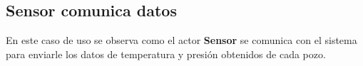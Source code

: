 \subsection{Sensor comunica datos}

\par En este caso de uso se observa como el actor \textbf{Sensor} se comunica con el sistema para enviarle los datos de temperatura y presión obtenidos de cada pozo. \\

